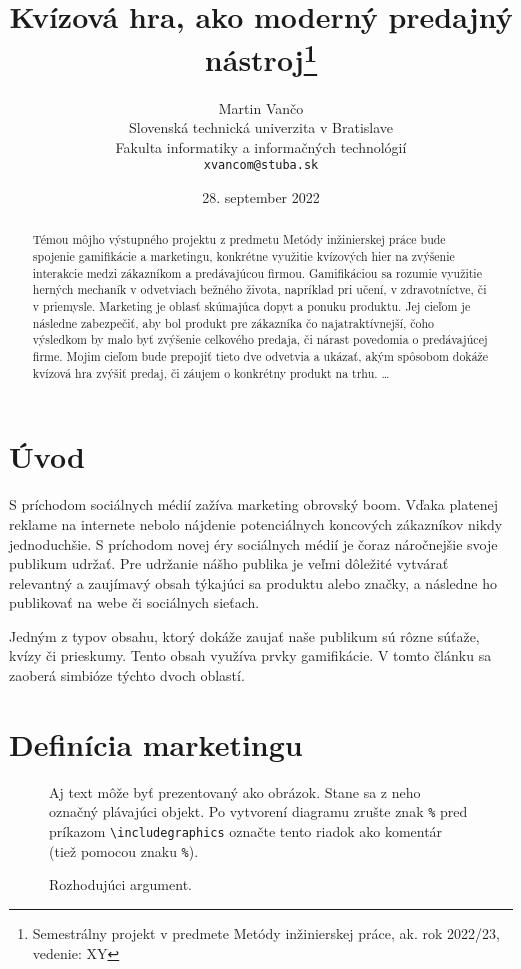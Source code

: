 \documentclass[10pt,twoside,slovak,a4paper]{article}
\title{Kvízová hra, ako moderný predajný nástroj\thanks{Semestrálny projekt v predmete Metódy inžinierskej práce, ak. rok 2022/23, vedenie: XY}}
\author{Martin Vančo\\[2pt]
	{\small Slovenská technická univerzita v Bratislave}\\
	{\small Fakulta informatiky a informačných technológií}\\
	{\small \texttt{xvancom@stuba.sk}}
}
\date{\small 28. september 2022} %
\begin{document}
\maketitle

\begin{abstract}
	Témou môjho výstupného projektu z predmetu Metódy inžinierskej práce bude spojenie gamifikácie a marketingu, konkrétne využitie kvízových hier na zvýšenie interakcie medzi zákazníkom a predávajúcou firmou. Gamifikáciou sa rozumie využitie herných mechaník v odvetviach bežného života, napríklad pri učení,
	v zdravotníctve, či v priemysle. Marketing je oblasť skúmajúca dopyt a ponuku produktu. Jej cieľom je následne zabezpečiť, aby bol produkt pre zákazníka čo najatraktívnejší, čoho výsledkom by malo byť zvýšenie celkového predaja, či nárast povedomia o predávajúcej firme. Mojim cieľom bude prepojiť tieto dve odvetvia a ukázať, akým spôsobom dokáže kvízová hra zvýšiť predaj, či záujem o konkrétny produkt na trhu.
\ldots
\end{abstract}


\section{Úvod}
S príchodom sociálnych médií zažíva marketing obrovský boom. Vďaka platenej reklame na internete nebolo nájdenie potenciálnych koncových zákazníkov nikdy jednoduchšie. S príchodom novej éry sociálnych médií  je čoraz náročnejšie svoje publikum udržať. Pre udržanie nášho publika je veľmi dôležité vytvárať relevantný a zaujímavý obsah týkajúci sa produktu alebo značky, a následne ho publikovať na webe či sociálnych sieťach. 

Jedným z typov obsahu, ktorý dokáže zaujať naše publikum sú rôzne súťaže, kvízy či prieskumy. Tento obsah využíva prvky gamifikácie. V tomto článku sa zaoberá simbióze týchto dvoch oblastí.

\section{Definícia marketingu}\label{Definícia marketingu}


\begin{figure*}[tbh]
\centering
Aj text môže byť prezentovaný ako obrázok. Stane sa z neho označný plávajúci objekt. Po vytvorení diagramu zrušte znak \texttt{\%} pred príkazom \verb|\includegraphics| označte tento riadok ako komentár (tiež pomocou znaku \texttt{\%}).
\caption{Rozhodujúci argument.}
\label{f:rozhod}
\end{figure*}
\end{document}

